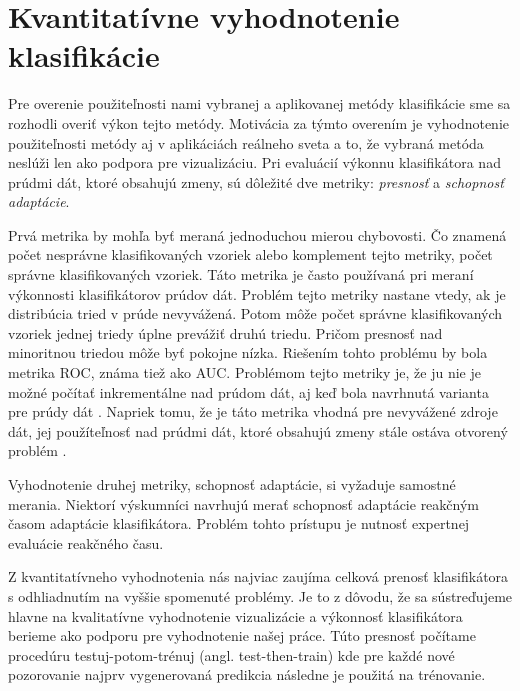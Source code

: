 \section{Kvantitatívne vyhodnotenie klasifikácie}
Pre overenie použiteľnosti nami vybranej a aplikovanej metódy klasifikácie sme sa rozhodli overiť výkon tejto metódy. Motivácia za týmto overením je vyhodnotenie použiteľnosti metódy aj v aplikáciách reálneho sveta a to, že vybraná metóda neslúži len ako podpora pre vizualizáciu. Pri evaluácií výkonnu klasifikátora nad prúdmi dát, ktoré obsahujú zmeny, sú dôležité dve metriky: \textit{presnosť} a \textit{schopnosť adaptácie}.
\par
Prvá metrika by mohľa byť meraná jednoduchou mierou chybovosti. Čo znamená počet nesprávne klasifikovaných vzoriek alebo komplement tejto metriky, počet správne klasifikovaných vzoriek. Táto metrika je často používaná pri meraní výkonnosti klasifikátorov prúdov dát. Problém tejto metriky nastane vtedy, ak je distribúcia tried v prúde nevyvážená. Potom môže počet správne klasifikovaných vzoriek jednej triedy úplne prevážiť druhú triedu. Pričom presnosť nad minoritnou triedou môže byť pokojne nízka. Riešením tohto problému by bola metrika ROC, známa tiež ako AUC. Problémom tejto metriky je, že ju nie je možné počítať inkrementálne nad prúdom dát, aj keď bola navrhnutá varianta pre prúdy dát \citep{brzezinski2014prequential}. Napriek tomu, že je táto metrika vhodná pre nevyvážené zdroje dát, jej použíteľnosť nad prúdmi dát, ktoré obsahujú zmeny stále ostáva otvorený problém \citep{brzezinski2014prequential}.
\par
Vyhodnotenie druhej metriky, schopnosť adaptácie, si vyžaduje samostné merania. Niektorí výskumníci navrhujú merať schopnosť adaptácie reakčným časom adaptácie klasifikátora. Problém tohto prístupu je nutnosť expertnej evaluácie reakčného času.
\par
Z kvantitatívneho vyhodnotenia nás najviac zaujíma celková prenosť klasifikátora s odhliadnutím na vyššie spomenuté problémy. Je to z dôvodu, že sa sústreďujeme hlavne na kvalitatívne vyhodnotenie vizualizácie a výkonnosť klasifikátora berieme ako podporu pre vyhodnotenie našej práce. Túto presnosť počítame procedúru testuj-potom-trénuj (angl. test-then-train) kde pre každé nové pozorovanie najprv vygenerovaná predikcia následne je použitá na trénovanie.

